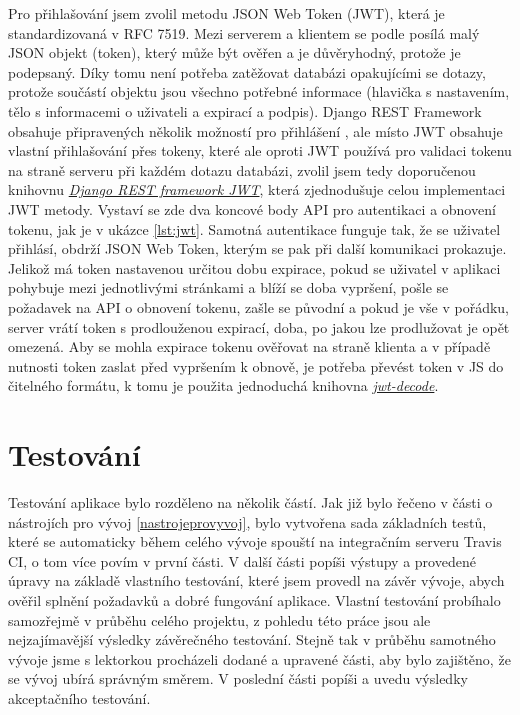     Pro přihlašování jsem zvolil metodu JSON Web Token (JWT), která je standardizovaná v RFC 7519. Mezi serverem a klientem se podle \cite{jwt1} posílá malý JSON objekt (token), který může být ověřen a je důvěryhodný, protože je podepsaný. Díky tomu není potřeba zatěžovat databázi opakujícími se dotazy, protože součástí objektu jsou všechno potřebné informace (hlavička s nastavením, tělo s informacemi o uživateli a expirací a podpis). Django REST Framework obsahuje připravených několik možností pro přihlášení \cite{drf1}, ale místo JWT obsahuje vlastní přihlašování přes tokeny, které ale oproti JWT používá pro validaci tokenu na straně serveru při každém dotazu databázi, zvolil jsem tedy doporučenou knihovnu \href{http://getblimp.github.io/django-rest-framework-jwt/}{\textit{Django REST framework JWT}}, která zjednodušuje celou implementaci JWT metody. Vystaví se zde dva koncové body API pro autentikaci a obnovení tokenu, jak je v ukázce \ref{lst:jwt}. Samotná autentikace funguje tak, že se uživatel přihlásí, obdrží JSON Web Token, kterým se pak při další komunikaci prokazuje. Jelikož má token nastavenou určitou dobu expirace, pokud se uživatel v aplikaci pohybuje mezi jednotlivými stránkami a blíží se doba vypršení, pošle se požadavek na API o obnovení tokenu, zašle se původní a pokud je vše v pořádku, server vrátí token s prodlouženou expirací, doba, po jakou lze prodlužovat je opět omezená. Aby se mohla expirace tokenu ověřovat na straně klienta a v případě nutnosti token zaslat před vypršením k obnově, je potřeba převést token v JS do čitelného formátu, k tomu je použita jednoduchá knihovna \href{https://github.com/auth0/jwt-decode}{\textit{jwt-decode}}.

    
\chapter{Testování}\label{testovani}
    Testování aplikace bylo rozděleno na několik částí. Jak již bylo řečeno v části o nástrojích pro vývoj \ref{nastrojeprovyvoj}, bylo vytvořena sada základních testů, které se automaticky během celého vývoje spouští na integračním serveru Travis CI, o tom více povím v první části. V další části popíši výstupy a provedené úpravy na základě vlastního testování, které jsem provedl na závěr vývoje, abych ověřil splnění požadavků a dobré fungování aplikace. Vlastní testování probíhalo samozřejmě v průběhu celého projektu, z pohledu této práce jsou ale nejzajímavější výsledky závěrečného testování. Stejně tak v průběhu samotného vývoje jsme s lektorkou procházeli dodané a upravené části, aby bylo zajištěno, že se vývoj ubírá správným směrem. V poslední části popíši a uvedu výsledky akceptačního testování. 

